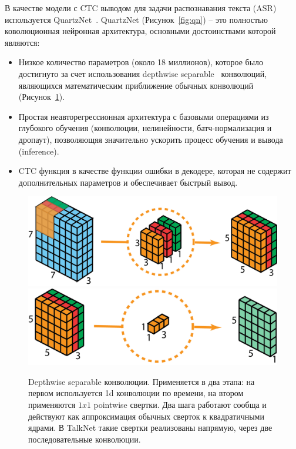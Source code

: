 В качестве модели с CTC выводом для задачи распознавания текста (ASR) используется QuartzNet~\cite{quartznet}. QuartzNet (Рисунок~\ref{fig:qn}) -- это полностью коволюционная нейронная архитектура, основными достоинствами которой являются:
\begin{itemize}
    \item Низкое количество параметров (около 18 миллионов), которое было достигнуто за счет использования depthwise separable~\cite{kaiser2017depthwise} конволюций, являющихся математическим приближение обычных конволюций (Рисунок~\ref{fig:dws-conv}).
    \item Простая неавторегрессионная архитектура с базовыми операциями из глубокого обучения (конволюции, нелинейности, батч-нормализация и дропаут), позволяющяя значительно ускорить процесс обучения и вывода (inference).
    \item CTC функция в качестве функции ошибки в декодере, которая не содержит дополнительных параметров и обеспечивает быстрый вывод.
\end{itemize}

\begin{figure}[!ht]
\centering
\includegraphics[width=1.0\textwidth]{images/snippets/dws-conv-1.png}
\includegraphics[width=1.0\textwidth]{images/snippets/dws-conv-2.png}
\caption{Depthwise separable конволюции. Применяется в два этапа: на первом используется 1d конволюции по времени, на втором применяются $1x1$ pointwise свертки. Два шага работают сообща и действуют как аппроксимация обычных сверток к квадратичными ядрами. В TalkNet такие свертки реализованы напрямую, через две последовательные конволюции.}
\label{fig:dws-conv}
\end{figure}

